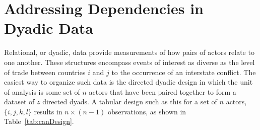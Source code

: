 \section{\textbf{Addressing Dependencies in Dyadic Data}}

Relational, or dyadic, data provide measurements of how pairs of actors relate to one another. These structures encompass events of interest as diverse as the level of trade between countries $i$ and $j$ to the occurrence of an interstate conflict. The easiest way to organize such data is the directed dyadic design in which the unit of analysis is some set of $n$ actors that have been paired together to form a dataset of $z$ directed dyads. A tabular design such as this for a set of $n$ actors, $\{i, j, k, l \}$ results in $n \times (n-1)$ observations, as shown in Table~\ref{tab:canDesign}. 

